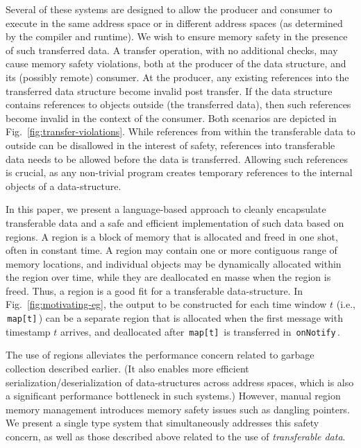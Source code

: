 \documentclass[a4paper,UKenglish]{lipics-v2018}
\newcommand{\C}[1]{\code{#1}}
\newcommand{\code}[1]{\,{\tt #1}\,}
\begin{document}
Several of these systems are designed to allow the producer and
consumer to execute in the same address space or in different address
spaces (as determined by the compiler and runtime).  We wish to ensure
memory safety in the presence of such transferred data.  A transfer
operation, with no additional checks, may cause memory safety
violations, both at the producer of the data structure, and its
(possibly remote) consumer. At the producer, any existing references
into the transferred data structure become invalid post transfer. If
the data structure contains references to objects outside (the
transferred data), then such references become invalid in the context
of the consumer. Both scenarios are depicted in
Fig.~\ref{fig:transfer-violations}.  While references from within the
transferable data to outside can be disallowed in the interest of
safety, references into transferable data needs to be allowed before
the data is transferred. Allowing such references is crucial, as any
non-trivial program creates temporary references to the internal
objects of a data-structure.

In this paper, we present a language-based approach to cleanly
encapsulate transferable data and a safe and efficient implementation
of such data based on regions. 
%
A region is a block of memory that is allocated
and freed in one shot, often in constant time. A region may contain
one or more contiguous range of memory locations, and individual
objects may be dynamically allocated within the region over time,
while they are deallocated en masse when the region is freed.  Thus, a
region is a good fit for a transferable data-structure.  In
Fig.~\ref{fig:motivating-eg}, the output to be constructed for each
time window $t$ (i.e., \C{map[t]}) can be a separate region that is
allocated when the first message with timestamp $t$ arrives, and
deallocated after \C{map[t]} is transferred in \C{onNotify}.

The use of regions alleviates the performance concern related to
garbage collection described earlier. (It also enables more efficient
serialization/deserialization of data-structures across address spaces,
which is also a significant performance bottleneck in such systems.)
However, manual region memory management introduces memory safety
issues such as dangling pointers.
We present a single type system that simultaneously addresses
this safety concern, as well as those described above related to
the use of \emph{transferable data}.
\end{document}
